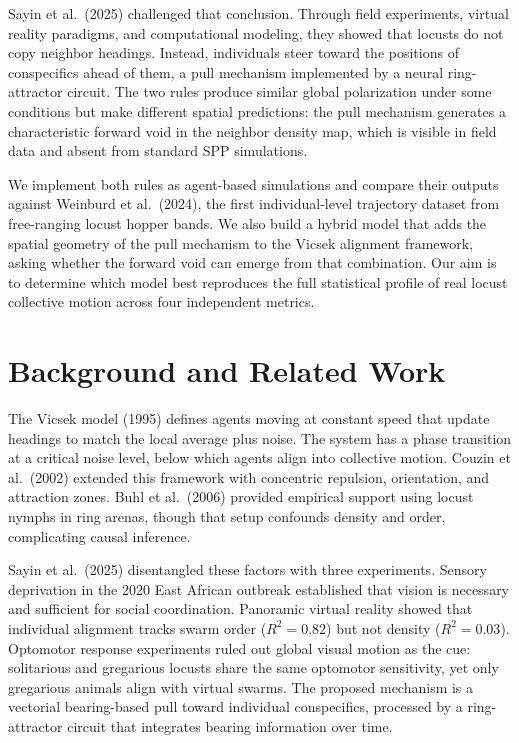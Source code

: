 \documentclass[11pt]{article}
\begin{document}
Sayin et al.\ (2025) challenged that conclusion. Through field experiments, virtual reality paradigms, and computational modeling, they showed that locusts do not copy neighbor headings. Instead, individuals steer toward the positions of conspecifics ahead of them, a pull mechanism implemented by a neural ring-attractor circuit. The two rules produce similar global polarization under some conditions but make different spatial predictions: the pull mechanism generates a characteristic forward void in the neighbor density map, which is visible in field data and absent from standard SPP simulations.

We implement both rules as agent-based simulations and compare their outputs against Weinburd et al.\ (2024), the first individual-level trajectory dataset from free-ranging locust hopper bands. We also build a hybrid model that adds the spatial geometry of the pull mechanism to the Vicsek alignment framework, asking whether the forward void can emerge from that combination. Our aim is to determine which model best reproduces the full statistical profile of real locust collective motion across four independent metrics.

\section{Background and Related Work}

The Vicsek model (1995) defines agents moving at constant speed that update headings to match the local average plus noise. The system has a phase transition at a critical noise level, below which agents align into collective motion. Couzin et al.\ (2002) extended this framework with concentric repulsion, orientation, and attraction zones. Buhl et al.\ (2006) provided empirical support using locust nymphs in ring arenas, though that setup confounds density and order, complicating causal inference.

Sayin et al.\ (2025) disentangled these factors with three experiments. Sensory deprivation in the 2020 East African outbreak established that vision is necessary and sufficient for social coordination. Panoramic virtual reality showed that individual alignment tracks swarm order ($R^2 = 0.82$) but not density ($R^2 = 0.03$). Optomotor response experiments ruled out global visual motion as the cue: solitarious and gregarious locusts share the same optomotor sensitivity, yet only gregarious animals align with virtual swarms. The proposed mechanism is a vectorial bearing-based pull toward individual conspecifics, processed by a ring-attractor circuit that integrates bearing information over time.
\end{document}
